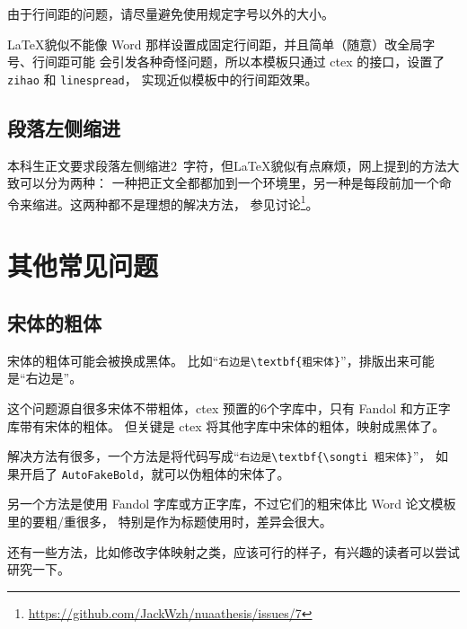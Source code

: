 由于行间距的问题，请尽量避免使用规定字号以外的大小。

\LaTeX 貌似不能像 Word 那样设置成固定行间距，并且简单（随意）改全局字号、行间距可能
会引发各种奇怪问题，所以本模板只通过 ctex 的接口，设置了 \texttt{zihao} 和 \texttt{linespread}，
实现近似模板中的行间距效果。

\subsection{段落左侧缩进}

本科生正文要求段落左侧缩进2~字符，但\LaTeX 貌似有点麻烦，网上提到的方法大致可以分为两种：
一种把正文全都都加到一个环境里，另一种是每段前加一个命令来缩进。这两种都不是理想的解决方法，
参见讨论\footnote{\url{https://github.com/JackWzh/nuaathesis/issues/7}}。

\section{其他常见问题}

\subsection{宋体的粗体}\label{txt:issue:boldsun}

宋体的粗体可能会被换成黑体。
比如“\verb|右边是\textbf{粗宋体}|”，排版出来可能是“{右边是}”。

这个问题源自很多宋体不带粗体，ctex 预置的6个字库中，只有 Fandol 和方正字库带有宋体的粗体。
但关键是 ctex 将其他字库中宋体的粗体，映射成黑体了。

解决方法有很多，一个方法是将代码写成“\verb|右边是\textbf{\songti 粗宋体}|”，
如果开启了 \texttt{AutoFakeBold}，就可以伪粗体的宋体了。

另一个方法是使用 Fandol 字库或方正字库，不过它们的粗宋体比 Word 论文模板里的要粗/重很多，
特别是作为标题使用时，差异会很大。

还有一些方法，比如修改字体映射之类，应该可行的样子，有兴趣的读者可以尝试研究一下。
